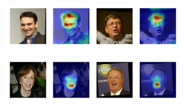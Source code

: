 \begin{figure}
\captionsetup[subfigure]{labelformat=empty}
    \centering
    \begin{subfigure}
        \centering
        \includegraphics[width=0.65\linewidth, trim={0 1cm 0 0},clip]{saliency-new/saliency-smooth/bald-1.jpeg}
        \footnotesize
        \vspace{0.4cm}
    \end{subfigure}
    
    \begin{subfigure}
        \centering
        \includegraphics[width=0.65\linewidth, trim={0 1cm 0 0},clip]{saliency-new/saliency-smooth/smile-1.jpeg}
        \footnotesize
        \vspace{0.4cm}
    \end{subfigure}
    

\end{figure}
